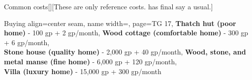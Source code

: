 \begin{PageBackLandscape}
\begin{TablesHalf}{\backTableHeight}
\begin{Table}{Common costs}[][These are only reference costs. \GM has final say a usual.]
\begin{entry}{Buying}{%
                align=center seam,
                name width=\turnLength,%
                page=TG 17,
            }
                \textbf{Thatch hut (poor home)} - 100 gp + 2 gp/month, \hfill
                \textbf{Wood cottage (comfortable home)} - 300 gp + 6 gp/month, \\
                \textbf{Stone house (quality home)} - 2,000 gp + 40 gp/month, \hfill
                \textbf{Wood, stone, and metal manse (fine home)} - 6,000 gp + 120 gp/month,\\
                \textbf{Villa (luxury home) } - 15,000 gp + 300 gp/month \hfill{}
            \end{entry}
        \end{Table}
    \end{TablesHalf}%
\end{PageBackLandscape}%


